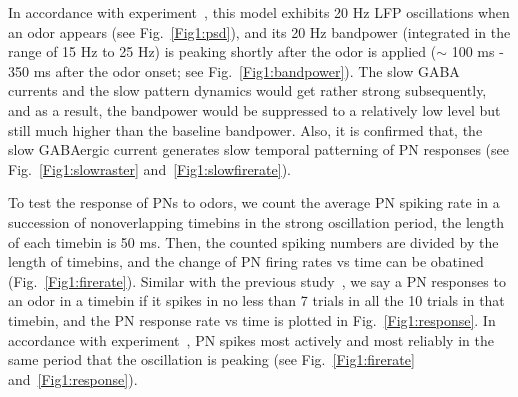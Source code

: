 \documentclass[12pt, a4paper]{article}
\begin{document}
In accordance with experiment~\citep{}, %
this model exhibits 20 Hz LFP oscillations when an odor appears (see Fig.~\ref{Fig1:psd}), and its 20 Hz bandpower (integrated in the range of 15 Hz to 25 Hz) is peaking shortly after the odor is applied ($\sim$ 100 ms - 350 ms after the odor onset; see Fig.~\ref{Fig1:bandpower}). The slow GABA currents and the slow pattern dynamics would get rather strong subsequently, and as a result, the bandpower would be suppressed to a relatively low level but still much higher than the baseline bandpower. Also, it is confirmed that, the slow GABAergic current generates slow temporal patterning of PN responses (see Fig.~\ref{Fig1:slowraster} and~\ref{Fig1:slowfirerate}).

To test the response of PNs to odors, we count the average PN spiking rate in a succession of nonoverlapping timebins in the strong oscillation period, the length of each timebin is 50 ms. Then, the counted spiking numbers are divided by the length of timebins, and the change of PN firing rates vs time can be obatined (Fig.~\ref{Fig1:firerate}). Similar with the previous study~\citep{}, we say a PN responses to an odor in a timebin if it spikes in no less than 7 trials in all the 10 trials in that timebin, and the PN response rate vs time is plotted in Fig.~\ref{Fig1:response}. In accordance with experiment~\citep{}, PN spikes most actively and most reliably in the same period that the oscillation is peaking (see Fig.~\ref{Fig1:firerate} and~\ref{Fig1:response}).
\end{document}

